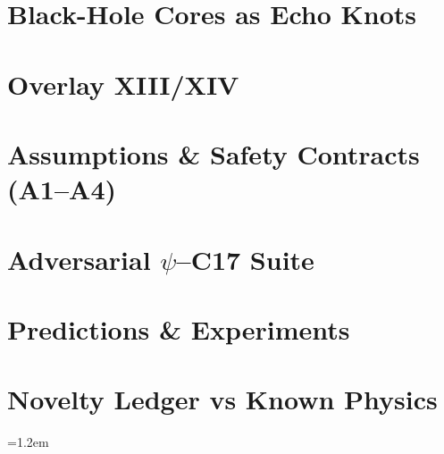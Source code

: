 \documentclass[11pt,oneside]{book}
\numberwithin{equation}{chapter}
\begin{document}
\chapter{Black-Hole Cores as Echo Knots}\label{chap:bh}


\chapter{Overlay XIII/XIV}\label{chap:overlay}


\chapter{Assumptions \& Safety Contracts (A1--A4)}\label{chap:contracts}


\chapter{Adversarial \texorpdfstring{$\psi$}{psi}–C17 Suite}\label{chap:adversarial}


\chapter{Predictions \& Experiments}\label{chap:predictions}


\chapter{Novelty Ledger vs Known Physics}\label{chap:novelty}


\emergencystretch=1.2em   %
\end{document}
